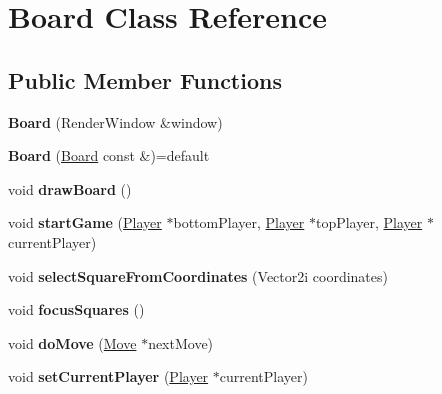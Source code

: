 \hypertarget{class_board}{}\section{Board Class Reference}
\label{class_board}
\subsection*{Public Member Functions}
\begin{DoxyCompactItemize}
\item 
\mbox{\label{class_board_a585c430e82e9e53020dbb503acd7b5b9}} 
{\bfseries Board} (Render\+Window \&window)
\item 
\mbox{\label{class_board_a167d2711ebed12b7f66563893a86e68f}} 
{\bfseries Board} (\mbox{\hyperlink{class_board}{Board}} const \&)=default
\item 
\mbox{\label{class_board_a1845216283a171939dcb477dce3a17b8}} 
void {\bfseries draw\+Board} ()
\item 
\mbox{\label{class_board_a4ae06b15573b9e33e3c0821aaa297443}} 
void {\bfseries start\+Game} (\mbox{\hyperlink{class_player}{Player}} $\ast$bottom\+Player, \mbox{\hyperlink{class_player}{Player}} $\ast$top\+Player, \mbox{\hyperlink{class_player}{Player}} $\ast$current\+Player)
\item 
\mbox{\label{class_board_ad879f0bb4294839df986a4c228608b54}} 
void {\bfseries select\+Square\+From\+Coordinates} (Vector2i coordinates)
\item 
\mbox{\label{class_board_a2d11c7b0de1e2b9a8137bf6c3bdd2528}} 
void {\bfseries focus\+Squares} ()
\item 
\mbox{\label{class_board_ae50158d0fdb0b1facb38809366cdc07b}} 
void {\bfseries do\+Move} (\mbox{\hyperlink{class_move}{Move}} $\ast$next\+Move)
\item 
\mbox{\label{class_board_ae4186ea27fa755a8b4f3340a187dbb84}} 
void {\bfseries set\+Current\+Player} (\mbox{\hyperlink{class_player}{Player}} $\ast$current\+Player)
\item 
\mbox{\label{class_board_ad64ef35c0f386828624f96502180f28b}} 

\end{DoxyCompactItemize}
